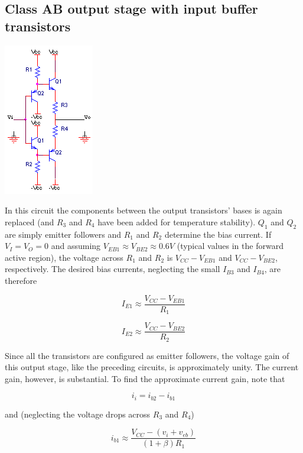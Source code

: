 \subsection{Class AB output stage with input buffer transistors}
\begin{center}
	\includegraphics{schematics/classABinputbuffers.PNG}
\end{center}
In this circuit the components between the output transistors' bases is again replaced (and $R_3$ and $R_4$ have been added for temperature stability).
$Q_1$ and $Q_2$ are simply emitter followers and $R_1$ and $R_2$ determine the bias current.
If $V_{I} = V_{O} = 0$ and assuming $V_{EB1} \approx V_{BE2} \approx 0.6V$ (typical values in the forward active region), the voltage across $R_1$ and $R_2$ is $V_{CC}-V_{EB1}$ and $V_{CC}-V_{BE2}$, respectively. The desired bias currents, neglecting the small $I_{B3}$ and $I_{B4}$, are therefore

\begin{equation}
I_{E1} \approx \frac{V_{CC}-V_{EB1}}{R_{1}}
\end{equation}

\begin{equation}
I_{E2} \approx \frac{V_{CC}-V_{BE2}}{R_{2}}
\end{equation}

Since all the transistors are configured as emitter followers, the voltage gain of this output stage, like the preceding circuits, is approximately unity.
The current gain, however, is substantial.
To find the approximate current gain, note that

\begin{equation}
i_{i} = i_{b2} - i_{b1}
\end{equation}

and (neglecting the voltage drops across $R_3$ and $R_4$)

\begin{equation}
i_{b1} \approx \frac{V_{CC}-(v_{i}+v_{eb})}{(1+\beta)R_1}
\end{equation}

